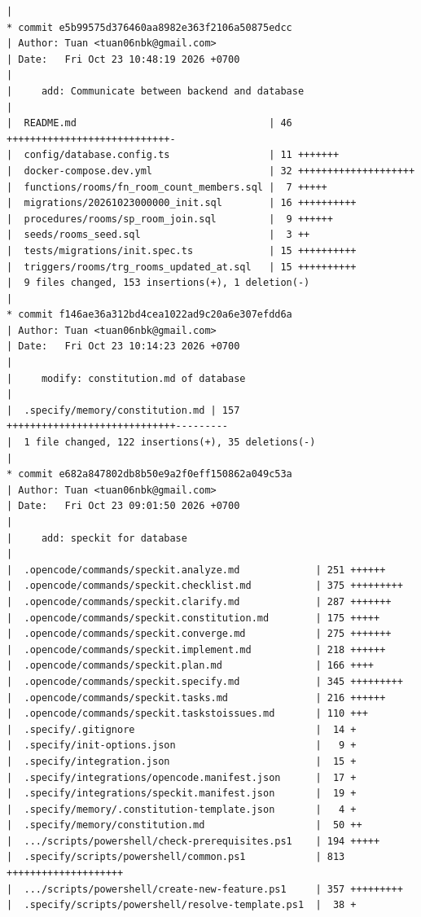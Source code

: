 \documentclass[12pt]{article}
\begin{document}
\begin{lstlisting}[numbers=none,breaklines=true]
|
* commit e5b99575d376460aa8982e363f2106a50875edcc
| Author: Tuan <tuan06nbk@gmail.com>
| Date:   Fri Oct 23 10:48:19 2026 +0700
|
|     add: Communicate between backend and database
|
|  README.md                                 | 46 ++++++++++++++++++++++++++++-
|  config/database.config.ts                 | 11 +++++++
|  docker-compose.dev.yml                    | 32 ++++++++++++++++++++
|  functions/rooms/fn_room_count_members.sql |  7 +++++
|  migrations/20261023000000_init.sql        | 16 ++++++++++
|  procedures/rooms/sp_room_join.sql         |  9 ++++++
|  seeds/rooms_seed.sql                      |  3 ++
|  tests/migrations/init.spec.ts             | 15 ++++++++++
|  triggers/rooms/trg_rooms_updated_at.sql   | 15 ++++++++++
|  9 files changed, 153 insertions(+), 1 deletion(-)
|
* commit f146ae36a312bd4cea1022ad9c20a6e307efdd6a
| Author: Tuan <tuan06nbk@gmail.com>
| Date:   Fri Oct 23 10:14:23 2026 +0700
|
|     modify: constitution.md of database
|
|  .specify/memory/constitution.md | 157 +++++++++++++++++++++++++++++---------
|  1 file changed, 122 insertions(+), 35 deletions(-)
|
* commit e682a847802db8b50e9a2f0eff150862a049c53a
| Author: Tuan <tuan06nbk@gmail.com>
| Date:   Fri Oct 23 09:01:50 2026 +0700
|
|     add: speckit for database
|
|  .opencode/commands/speckit.analyze.md             | 251 ++++++
|  .opencode/commands/speckit.checklist.md           | 375 +++++++++
|  .opencode/commands/speckit.clarify.md             | 287 +++++++
|  .opencode/commands/speckit.constitution.md        | 175 +++++
|  .opencode/commands/speckit.converge.md            | 275 +++++++
|  .opencode/commands/speckit.implement.md           | 218 ++++++
|  .opencode/commands/speckit.plan.md                | 166 ++++
|  .opencode/commands/speckit.specify.md             | 345 +++++++++
|  .opencode/commands/speckit.tasks.md               | 216 ++++++
|  .opencode/commands/speckit.taskstoissues.md       | 110 +++
|  .specify/.gitignore                               |  14 +
|  .specify/init-options.json                        |   9 +
|  .specify/integration.json                         |  15 +
|  .specify/integrations/opencode.manifest.json      |  17 +
|  .specify/integrations/speckit.manifest.json       |  19 +
|  .specify/memory/.constitution-template.json       |   4 +
|  .specify/memory/constitution.md                   |  50 ++
|  .../scripts/powershell/check-prerequisites.ps1    | 194 +++++
|  .specify/scripts/powershell/common.ps1            | 813 ++++++++++++++++++++
|  .../scripts/powershell/create-new-feature.ps1     | 357 +++++++++
|  .specify/scripts/powershell/resolve-template.ps1  |  38 +

\end{lstlisting}
\end{document}
